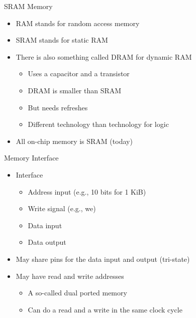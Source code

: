 \begin{frame}[fragile]{SRAM Memory}
\begin{itemize}
\item RAM stands for random access memory
\item SRAM stands for static RAM
\item There is also something called DRAM for dynamic RAM
\begin{itemize}
\item Uses a capacitor and a transistor
\item DRAM is smaller than SRAM
\item But needs refreshes
\item Different technology than technology for logic
\end{itemize}
\item All on-chip memory is SRAM (today)
\end{itemize}
\end{frame}

\begin{frame}[fragile]{Memory Interface}
\begin{itemize}
\item Interface
\begin{itemize}
\item Address input (e.g., 10 bits for 1 KiB)
\item Write signal (e.g., we)
\item Data input
\item Data output
\end{itemize}
\item May share pins for the data input and output (tri-state)
\item May have read and write addresses
\begin{itemize}
\item A so-called dual ported memory
\item Can do a read and a write in the same clock cycle
\end{itemize}
\end{itemize}
\end{frame}


